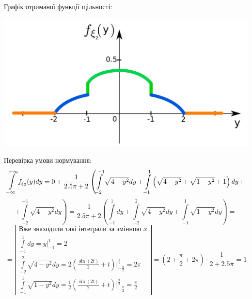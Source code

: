 \documentclass[14pt,a4paper]{scrartcl}
\theoremstyle{definition}
\theoremstyle{remark}
\theoremstyle{definition}
\theoremstyle{definition}
\begin{document}
Графік отриманої функції щільності:
\begin{center} \includegraphics[scale=0.4]{assets/fxi21.png} \end{center}
Перевірка умови нормування:
$$
 \int\limits_{-\infty}^{ +\infty}{ f_{\xi_2}(y)dy} = 0 + \frac{1}{ 2.5\pi + 2}
 \left( \int\limits_{-2}^{ -1}{ \sqrt{4 - y^2}dy }  +  \int\limits_{-1}^{ 1}{\left( \sqrt{4 - y^2} + \sqrt{1-y^2}+ 1  \right)dy} + \right.
$$
$$
+ \left. \int\limits_{-2}^{ -1}{ \sqrt{4 - y^2}dy } \right) =  \frac{1}{ 2.5\pi + 2}
\left( \int\limits_{-1}^{ 1}{dy}+  \int\limits_{-2}^{ 2}{\sqrt{4 - y^2}dy} +
 \int\limits_{-1}^{ 1}{\sqrt{1 - y^2} dy}
\right)=
$$
$$
= \left| \begin{gathered}
\text{Вже знаходили такі інтеграли за змінною } x \\
  \int\limits_{-1}^{ 1}{dy} = y\bigg|_{-1}^{1} = 2\\
	\int\limits_{-2}^{ 2}{\sqrt{4 - y^2}dy} =
	2\left( \frac{\sin{(2t)}}{2}   + t  \right)  \Bigg|_{ -\frac{\pi}{2} }^{ \frac{\pi}{2} 	} = 2 \pi \\
	 \int\limits_{-1}^{ 1}{\sqrt{1 - y^2}dy} = \frac{1}{2} \left(  \frac{\sin{(2t)}}{2}   + t  \right) \Bigg|^{ \frac{\pi}{2} }_{	-\frac{\pi}{2} 	} = \frac{\pi}{2}
\end{gathered} \right|
=(2 + \frac{\pi}{2} + 2\pi )\cdot \frac{1}{2 + 2.5\pi} = 1
$$

\newpage
\end{document}
